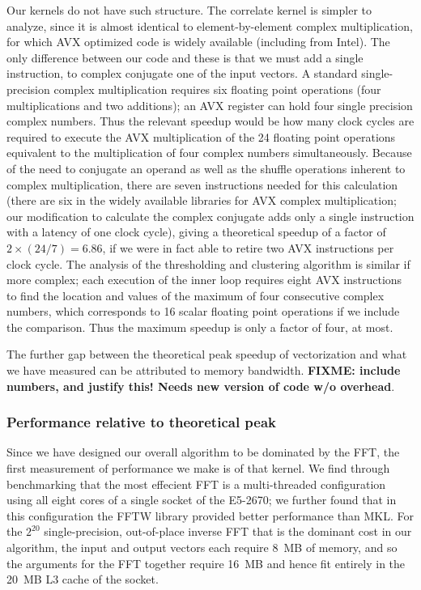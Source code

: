 \documentclass{article}
\begin{document}
Our kernels do not have such structure.  The correlate kernel is simpler to
analyze, since it is almost identical to element-by-element complex
multiplication, for which AVX optimized code is widely available (including from
Intel). The only difference between our code and these is that we must add a
single instruction, to complex conjugate one of the input vectors. A standard
single-precision complex multiplication requires six floating point operations
(four multiplications and two additions); an AVX register can hold four single
precision complex numbers. Thus the relevant speedup would be how many clock
cycles are required to execute the AVX multiplication of the 24 floating point
operations equivalent to the multiplication of four complex numbers
simultaneously. Because of the need to conjugate an operand as well as the
shuffle operations inherent to complex multiplication, there are seven
instructions needed for this calculation (there are six in the widely available
libraries for AVX complex multiplication; our modification to calculate the
complex conjugate adds only a single instruction with a latency of one clock
cycle),  giving a theoretical speedup of a factor of $2\times (24/7) = 6.86$, if
we were in fact able to retire two AVX instructions per clock cycle. The
analysis of the thresholding and clustering algorithm is similar if more
complex; each execution of the inner loop requires eight AVX instructions to
find the location and values of the maximum of four consecutive complex numbers,
which corresponds to 16 scalar floating point operations if we include the
comparison. Thus the maximum speedup is only a factor of four, at most. 

The further gap between the theoretical peak speedup of vectorization and what
we have measured can be attributed to memory bandwidth. \textbf{FIXME: include
  numbers, and justify this!  Needs new version of code w/o overhead}.

\subsubsection{Performance relative to theoretical peak}
\label{sec:perf-relat-theor}

Since we have designed our overall algorithm to be dominated by the FFT, the
first measurement of performance we make is of that kernel.  We find through
benchmarking that the most effecient FFT is a multi-threaded configuration using
all eight cores of a single socket of the E5-2670; we further found that in this
configuration the FFTW library provided better performance than MKL. For the
$2^{20}$ single-precision, out-of-place inverse FFT that is the dominant cost in our
algorithm, the input and output vectors each require 8~MB of memory, and so the
arguments for the FFT together require 16~MB and hence fit entirely in the 20~MB
L3 cache of the socket.
\end{document}
